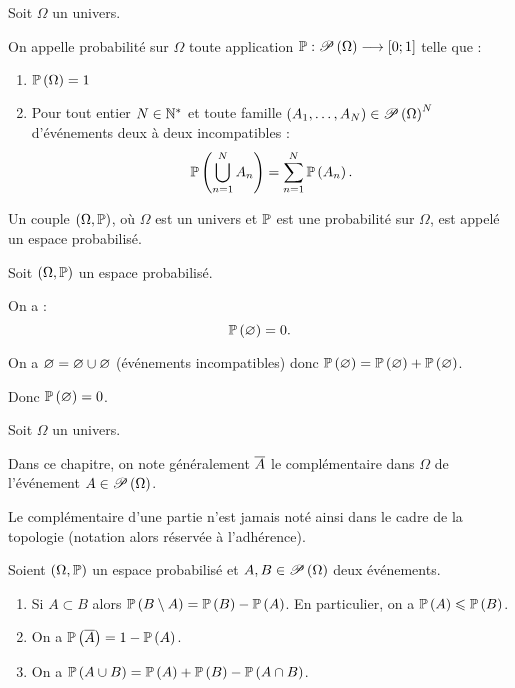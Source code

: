 \begin{defi}[Probabilité]
Soit \(\Omega\) un univers.

On appelle probabilité sur \(\Omega\) toute application \(\prem:\P{\Omega}\to\intervii{0}{1}\) telle que :

\begin{enumerate}
    \item \(\proba{\Omega}=1\) \\
    \item Pour tout entier \(N\in\Ns\) et toute famille \(\paren{A_1,\dots,A_N}\in\P{\Omega}^N\) d'événements deux à deux incompatibles : \[\proba{\bigunion_{n=1}^NA_n}=\sum_{n=1}^N\proba{A_n}.\]
\end{enumerate}
\end{defi}

\begin{defi}
Un couple \(\groupe{\Omega}[\prem]\), où \(\Omega\) est un univers et \(\prem\) est une probabilité sur \(\Omega\), est appelé un espace probabilisé.
\end{defi}

\begin{rem}
Soit \(\groupe{\Omega}[\prem]\) un espace probabilisé.

On a : \[\proba{\ensvide}=0.\]
\end{rem}

\begin{dem}
On a \(\ensvide=\ensvide\union\ensvide\) (événements incompatibles) donc \(\proba{\ensvide}=\proba{\ensvide}+\proba{\ensvide}\).

Donc \(\proba{\ensvide}=0\).
\end{dem}

\begin{rem}
Soit \(\Omega\) un univers.

Dans ce chapitre, on note généralement \(\conj{A}\) le complémentaire dans \(\Omega\) de l'événement \(A\in\P{\Omega}\).

Le complémentaire d'une partie n'est jamais noté ainsi dans le cadre de la topologie (notation alors réservée à l'adhérence).
\end{rem}

\begin{prop}
Soient \(\groupe{\Omega}[\prem]\) un espace probabilisé et \(A,B\in\P{\Omega}\) deux événements.

\begin{enumerate}
    \item Si \(A\subset B\) alors \(\proba{B\excluant A}=\proba{B}-\proba{A}\). En particulier, on a \(\proba{A}\leq\proba{B}\). \\
    \item On a \(\proba{\conj{A}}=1-\proba{A}\). \\
    \item On a \(\proba{A\union B}=\proba{A}+\proba{B}-\proba{A\inter B}\).
\end{enumerate}
\end{prop}

